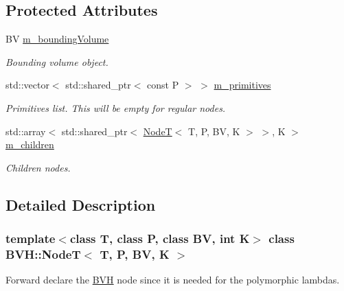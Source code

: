 \subsection*{Protected Attributes}
\begin{DoxyCompactItemize}
\item 
\mbox{\label{classBVH_1_1NodeT_a7f8720f2ab03ee9e81de114c479cb2e5}} 
BV \hyperlink{classBVH_1_1NodeT_a7f8720f2ab03ee9e81de114c479cb2e5}{m\+\_\+bounding\+Volume}
\begin{DoxyCompactList}\small\item\em Bounding volume object. \end{DoxyCompactList}\item 
\mbox{\label{classBVH_1_1NodeT_a3c45be2075d8cdfd0dc0a9e73373b64d}} 
std\+::vector$<$ std\+::shared\+\_\+ptr$<$ const P $>$ $>$ \hyperlink{classBVH_1_1NodeT_a3c45be2075d8cdfd0dc0a9e73373b64d}{m\+\_\+primitives}
\begin{DoxyCompactList}\small\item\em Primitives list. This will be empty for regular nodes. \end{DoxyCompactList}\item 
\mbox{\label{classBVH_1_1NodeT_afaf556d6faa78c2cc2b27c82feb0145c}} 
std\+::array$<$ std\+::shared\+\_\+ptr$<$ \hyperlink{classBVH_1_1NodeT}{NodeT}$<$ T, P, BV, K $>$ $>$, K $>$ \hyperlink{classBVH_1_1NodeT_afaf556d6faa78c2cc2b27c82feb0145c}{m\+\_\+children}
\begin{DoxyCompactList}\small\item\em Children nodes. \end{DoxyCompactList}\end{DoxyCompactItemize}


\subsection{Detailed Description}
\subsubsection*{template$<$class T, class P, class BV, int K$>$\newline
class B\+V\+H\+::\+Node\+T$<$ T, P, B\+V, K $>$}

Forward declare the \hyperlink{namespaceBVH}{B\+VH} node since it is needed for the polymorphic lambdas. 

